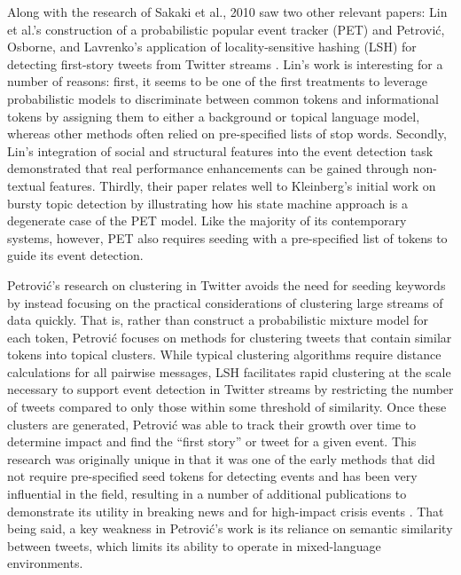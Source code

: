 \documentclass{acm_proc_article-sp}
\begin{document}
Along with the research of Sakaki et al., 2010 saw two other relevant papers: Lin et al.'s construction of a probabilistic popular event tracker (PET) \cite{Lin:2010:PSM:1835804.1835922} and Petrovi\'{c}, Osborne, and Lavrenko's application of locality-sensitive hashing (LSH) for detecting first-story tweets from Twitter streams \cite{Petrovic:2010:SFS:1857999.1858020}.
Lin's work is interesting for a number of reasons: first, it seems to be one of the first treatments to leverage probabilistic models to discriminate between common tokens and informational tokens by assigning them to either a background or topical language model, whereas other methods often relied on pre-specified lists of stop words.
Secondly, Lin's integration of social and structural features into the event detection task demonstrated that real performance enhancements can be gained through non-textual features.
Thirdly, their paper relates well to Kleinberg's initial work on bursty topic detection by illustrating how his state machine approach is a degenerate case of the PET model.
Like the majority of its contemporary systems, however, PET also requires seeding with a pre-specified list of tokens to guide its event detection.

Petrovi\'{c}'s research on clustering in Twitter avoids the need for seeding keywords by instead focusing on the practical considerations of clustering large streams of data quickly.
That is, rather than construct a probabilistic mixture model for each token, Petrovi\'{c} focuses on methods for clustering tweets that contain similar tokens into topical clusters.
While typical clustering algorithms require distance calculations for all pairwise messages, LSH facilitates rapid clustering at the scale necessary to support event detection in Twitter streams by restricting the number of tweets compared to only those within some threshold of similarity.
Once these clusters are generated, Petrovi\'{c} was able to track their growth over time to determine impact and find the ``first story'' or tweet for a given event.
This research was originally unique in that it was one of the early methods that did not require pre-specified seed tokens for detecting events and has been very influential in the field, resulting in a number of additional publications to demonstrate its utility in breaking news and for high-impact crisis events \cite{Petrovic:2012:UPI:2382029.2382072,osborne2014real,petrovic2013can,6601695}.
That being said, a key weakness in Petrovi\'{c}'s work is its reliance on semantic similarity between tweets, which limits its ability to operate in mixed-language environments.
\end{document}
